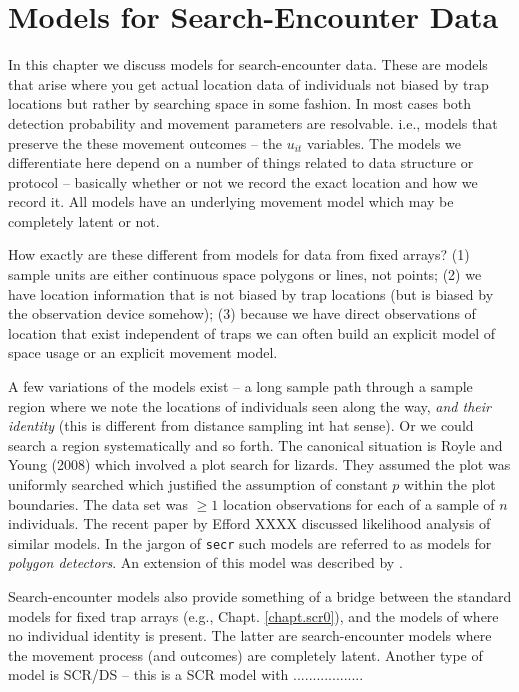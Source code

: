 \chapter{Models for  Search-Encounter Data}
\label{chapt.searchencounter}

\vspace{0.3cm}


In this chapter we discuss models for 
search-encounter data. These are models that arise where you get
actual location data of individuals not biased by trap locations but
rather by searching space in some fashion. In most cases both
detection probability and movement parameters are resolvable. i.e.,
models that preserve the these movement outcomes -- the $u_{it}$ variables.
The models we differentiate here depend on a number of
things related to data structure or protocol -- basically whether or
not we record the exact location and how we record it. All models have
an underlying movement model which may be completely latent or not.

How exactly
are these different from models for data from fixed arrays?  (1)
sample units are either continuous space polygons or lines, not
points; (2) we have location information that is not biased by trap
locations (but is biased by the observation device somehow); (3)
because we have direct observations of location that exist independent
of traps we can often build an explicit model of space usage or an
explicit movement model.

A few variations of the models exist -- a long sample path through a
sample region where we note the locations of individuals seen along
the way, {\it and their identity} (this is different from distance
sampling int hat sense). Or we could search a region systematically
and so forth.  
The canonical situation is Royle and Young (2008) which involved a
plot search for lizards. They assumed the plot was uniformly searched
which justified the assumption of constant $p$ within the plot
boundaries. The data set was $\ge 1$ location observations for each of
a sample of $n$ individuals. 
The recent paper by Efford XXXX
discussed likelihood analysis of similar models. In the jargon of
\mbox{\tt secr} such models are referred to as models for {\it polygon detectors}.
 An extension of this model was described
by \citep{royle_etal:2011mee}.  

Search-encounter models also provide something of a bridge between the
standard models for fixed trap arrays (e.g., Chapt. \ref{chapt.scr0}),
and the models of \citep{chandler_royle:2012} where no individual
identity is present. The latter are search-encounter models where the
movement process (and outcomes) are completely latent. Another type of
model is SCR/DS -- this is a SCR model with ..................

